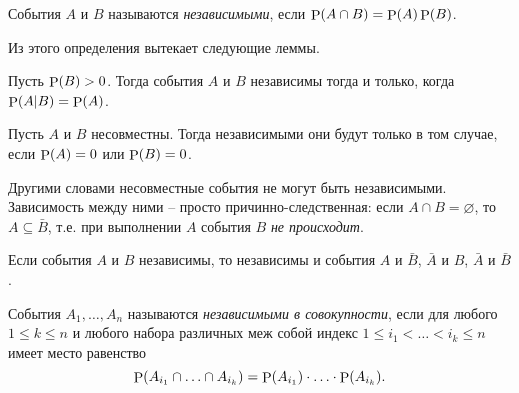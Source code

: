 \begin{to_def}
    События $A$ и $B$ называются \textit{независимыми}, если $\P(A \cap B) = \P(A) \P(B)$.
\end{to_def}

Из этого определения вытекает следующие леммы.

\begin{to_lem}
    Пусть $\P(B) > 0$. Тогда события $A$ и $B$ независимы тогда и только, когда $\P(A|B) = \P(A)$. 
\end{to_lem}

\begin{to_lem}
    Пусть $A$ и $B$ несовместны. Тогда независимыми они будут только в том случае, если $\P(A) = 0$ или $\P(B) = 0$.
\end{to_lem}

Другими словами несовместные события не могут быть независимыми. Зависимость между ними -- просто причинно-следственная: если $A\cap B = \varnothing$, то $A \subseteq \bar{B}$, т.е. при выполнении $A$ события $B$  \textit{не происходит}.


\begin{to_lem}
    Если события $A$ и $B$ независимы, то независимы и события $A$ и $\bar{B}$, $\bar{A}$ и $B$, $\bar{A}$ и $\bar{B}$.
\end{to_lem}


\begin{to_def}
    События $A_1, \ldots, A_n$ называются \textit{независимыми в совокупности}, если для любого $1 \leq k \leq n$ и любого набора различных меж собой индекс $1 \leq i_1 < \ldots < i_k \leq n$ имеет место равенство
    \begin{equation*}
        \P(A_{i_1} \cap \ldots \cap A_{i_k}) = \P (A_{i_1}) \cdot \ldots \cdot \P(A_{i_k}).
    \end{equation*}
\end{to_def}
